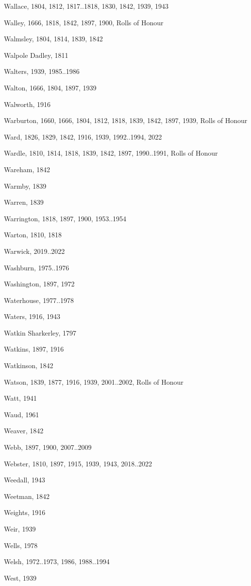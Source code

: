 \begin{theindex}
\item Wallace, 1804, 1812, 1817..1818, 1830, 1842, 1939, 1943
\item Walley, 1666, 1818, 1842, 1897, 1900, Rolls of Honour
\item Walmsley, 1804, 1814, 1839, 1842
\item Walpole Dadley, 1811
\item Walters, 1939, 1985..1986
\item Walton, 1666, 1804, 1897, 1939
\item Walworth, 1916
\item Warburton, 1660, 1666, 1804, 1812, 1818, 1839, 1842, 1897, 1939, Rolls of Honour
\item Ward, 1826, 1829, 1842, 1916, 1939, 1992..1994, 2022
\item Wardle, 1810, 1814, 1818, 1839, 1842, 1897, 1990..1991, Rolls of Honour
\item Wareham, 1842
\item Warmby, 1839
\item Warren, 1839
\item Warrington, 1818, 1897, 1900, 1953..1954
\item Warton, 1810, 1818
\item Warwick, 2019..2022
\item Washburn, 1975..1976
\item Washington, 1897, 1972
\item Waterhouse, 1977..1978
\item Waters, 1916, 1943
\item Watkin Sharkerley, 1797
\item Watkins, 1897, 1916
\item Watkinson, 1842
\item Watson, 1839, 1877, 1916, 1939, 2001..2002, Rolls of Honour
\item Watt, 1941
\item Waud, 1961
\item Weaver, 1842
\item Webb, 1897, 1900, 2007..2009
\item Webster, 1810, 1897, 1915, 1939, 1943, 2018..2022
\item Weedall, 1943
\item Weetman, 1842
\item Weights, 1916
\item Weir, 1939
\item Wells, 1978
\item Welsh, 1972..1973, 1986, 1988..1994
\item West, 1939

\end{theindex}
